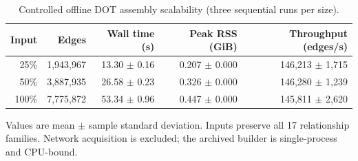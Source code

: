 \begin{table}[t]
\centering
\caption{Controlled offline DOT assembly scalability (three sequential runs per size).}
\label{tab:rq1-scaling}
\begin{tabular}{r r r r r}
\toprule
Input & Edges & Wall time (s) & Peak RSS (GiB) & Throughput (edges/s) \\
\midrule
25\% & 1,943,967 & 13.30 $\pm$ 0.16 & 0.207 $\pm$ 0.000 & 146,213 $\pm$ 1,715 \\
50\% & 3,887,935 & 26.58 $\pm$ 0.23 & 0.326 $\pm$ 0.000 & 146,280 $\pm$ 1,239 \\
100\% & 7,775,872 & 53.34 $\pm$ 0.96 & 0.447 $\pm$ 0.000 & 145,811 $\pm$ 2,620 \\
\bottomrule
\end{tabular}
\vspace{2pt}
\begin{minipage}{0.98\columnwidth}\footnotesize Values are mean $\pm$ sample standard deviation. Inputs preserve all 17 relationship families. Network acquisition is excluded; the archived builder is single-process and CPU-bound.\end{minipage}
\end{table}
